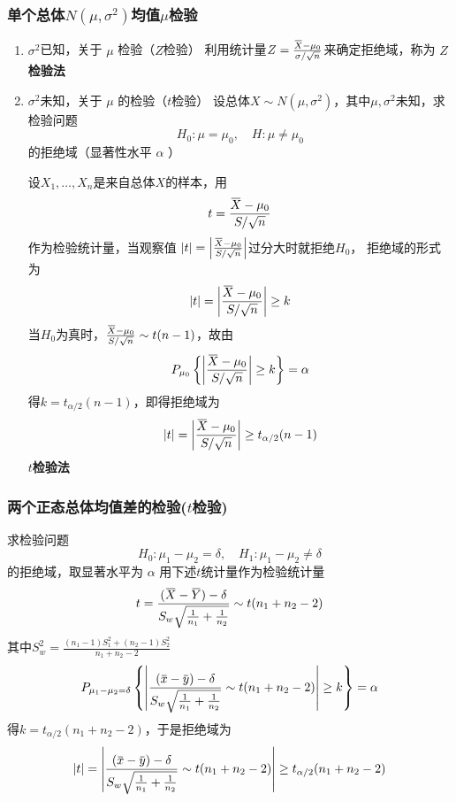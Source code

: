 \documentclass[11pt]{article}
\begin{document}
\subsubsection{单个总体\(N(μ,σ^2)\)均值\(μ\)检验}
\label{sec:org877bf05}
\begin{enumerate}
\item \(\sigma^2\)已知，关于 \(\mu\) 检验（\(Z\)检验）
利用统计量\(Z=\frac{\bbar{X}-\mu_0}{\sigma/\sqrt{n}}\)来确定拒绝域，称为
\textbf{\(Z\)检验法}
\item \(\sigma^2\)未知，关于 \(\mu\) 的检验（\(t\)检验）
设总体\(X\sim N(\mu,\sigma^2)\)，其中\(\mu,\sigma^2\)未知，求检验问题
\begin{equation*}
H_0:\mu=\mu_0,\quad H:\mu\neq\mu_0
\end{equation*}
的拒绝域（显著性水平 \(\alpha\) ）

设\(X_1,\dots,X_n\)是来自总体\(X\)的样本，用
\begin{equation*}
t=\frac{\bbar{X}-\mu_0}{S/\sqrt{n}}
\end{equation*}
作为检验统计量，当观察值
\(\abs{t}=\abs{\frac{\bbar{X}-\mu_0}{S/\sqrt{n}}}\)过分大时就拒绝\(H_0\)，
拒绝域的形式为
\begin{equation*}
\abs{t}=\abs{\frac{\bbar{X}-\mu_0}{S/\sqrt{n}}}\ge k
\end{equation*}
当\(H_0\)为真时，\(\frac{\bbar{X}-\mu_0}{S/\sqrt{n}}\sim t(n-1)\)，故由
\begin{equation*}
P_{\mu_0}\left\{\abs{\frac{\bbar{X}-\mu_0}{S/\sqrt{n}}}\ge k
\right\}=\alpha
\end{equation*}
得\(k=t_{\alpha/2}(n-1)\)，即得拒绝域为
\begin{equation*}
\abs{t}=\abs{\frac{\bbar{X}-\mu_0}{S/\sqrt{n}}}\ge t_{\alpha/2}(n-1)
\end{equation*}
\textbf{\(t\)检验法}
\end{enumerate}
\subsubsection{两个正态总体均值差的检验(\(t\)检验)}
\label{sec:orgd233109}
求检验问题
\begin{equation*}
H_0:\mu_1-\mu_2=\delta,\quad H_1:\mu_1-\mu_2\neq\delta
\end{equation*}
的拒绝域，取显著水平为 \(\alpha\)
用下述\(t\)统计量作为检验统计量
\begin{equation*}
t=\frac{(\bbar{X}-\bbar{Y})-\delta}{S_w\sqrt{\frac{1}{n_1}+\frac{1}{n_2}}}\sim t(n_1+n_2-2)
\end{equation*}
其中\(S_w^2=\frac{(n_1-1)S_1^2+(n_2-1)S_2^2}{n_1+n_2-2}\)
\begin{equation*}
P_{\mu_1-\mu_2=\delta}\left\{
\abs{\frac{(\bbar{x}-\bbar{y})-\delta}{S_w\sqrt{\frac{1}{n_1}+\frac{1}{n_2}}}\sim t(n_1+n_2-2)}
\ge k
\right\}=\alpha
\end{equation*}
得\(k=t_{\alpha/2}(n_1+n_2-2)\)，于是拒绝域为
\begin{equation*}
\abs{t}=
\abs{\frac{(\bbar{x}-\bbar{y})-\delta}{S_w\sqrt{\frac{1}{n_1}+\frac{1}{n_2}}}\sim t(n_1+n_2-2)}
\ge t_{\alpha/2}(n_1+n_2-2)
\end{equation*}
\end{document}
